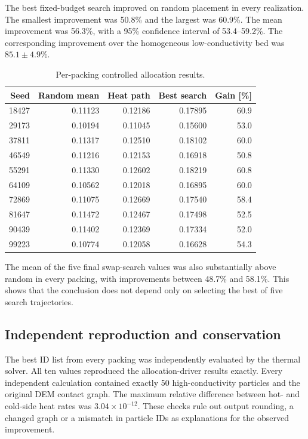\documentclass[12pt,a4paper]{article}
\begin{document}
	The best fixed-budget search improved on random placement in every realization.
	The smallest improvement was 50.8\% and the largest was 60.9\%. The mean
	improvement was 56.3\%, with a 95\% confidence interval of 53.4--59.2\%.
	The corresponding improvement over the homogeneous low-conductivity bed was
	$85.1\pm4.9$\%.
	
	\begin{table}[!htbp]
		\centering
		\caption{Per-packing controlled allocation results.}
		\label{tab:cases}
		\small
		\begin{tabular}{rrrrr}
			\toprule
			\textbf{Seed} & \textbf{Random mean} & \textbf{Heat path} &
			\textbf{Best search} & \textbf{Gain [\%]} \\
			\midrule
			18427 & 0.11123 & 0.12186 & 0.17895 & 60.9 \\
			29173 & 0.10194 & 0.11045 & 0.15600 & 53.0 \\
			37811 & 0.11317 & 0.12510 & 0.18102 & 60.0 \\
			46549 & 0.11216 & 0.12153 & 0.16918 & 50.8 \\
			55291 & 0.11330 & 0.12602 & 0.18219 & 60.8 \\
			64109 & 0.10562 & 0.12018 & 0.16895 & 60.0 \\
			72869 & 0.11075 & 0.12669 & 0.17540 & 58.4 \\
			81647 & 0.11472 & 0.12467 & 0.17498 & 52.5 \\
			90439 & 0.11402 & 0.12369 & 0.17334 & 52.0 \\
			99223 & 0.10774 & 0.12058 & 0.16628 & 54.3 \\
			\bottomrule
		\end{tabular}
	\end{table}
	
	The mean of the five final swap-search values was also substantially above
	random in every packing, with improvements between 48.7\% and 58.1\%. This
	shows that the conclusion does not depend only on selecting the best of five
	search trajectories.
	
	\subsection{Independent reproduction and conservation}
	
	The best ID list from every packing was independently evaluated by the thermal
	solver. All ten values reproduced the allocation-driver results exactly. Every
	independent calculation contained exactly 50 high-conductivity particles and
	the original DEM contact graph. The maximum relative difference between hot-
	and cold-side heat rates was $3.04\times10^{-12}$. These checks rule out output
	rounding, a changed graph or a mismatch in particle IDs as explanations for the
	observed improvement.
	
\end{document}
